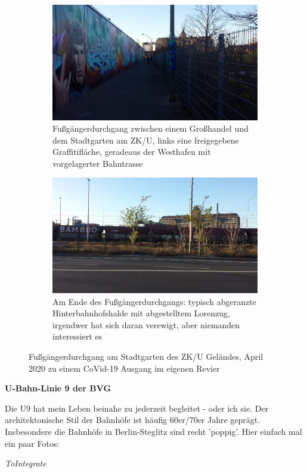 \begin{figure}[h]
\centering
	\begin{subfigure}[b]{0.49\textwidth}
    \includegraphics[width=1.0\textwidth]{img/inspiration/westhafen_view_preDurchgang.jpg}
   \caption{Fu{\ss}g\"angerdurchgang zwischen einem Gro{\ss}handel und dem Stadtgarten am ZK/U, links eine freigegebene Graffitifl\"ache, geradeaus der Westhafen mit vorgelagerter Bahntrasse}
    \label{img:inspiration_westhafen_view_preDurchgang}
    \end{subfigure}
	\begin{subfigure}[b]{0.49\textwidth}
    \includegraphics[width=1.0\textwidth]{img/inspiration/westhafen_view_postDurchgang.jpg}
   \caption{Am Ende des Fu{\ss}g\"angerdurchgangs: typisch abgeranzte Hinterbahnhofshalde mit abgestelltem Lorenzug, irgendwer hat sich daran verewigt, aber niemanden interessiert es\\}
    \label{img:inspiration_westhafen_view_postDurchgang}
    \end{subfigure}
	\caption{Fu{\ss}g\"angerdurchgang am Stadtgarten des ZK/U Gel\"andes, April 2020 zu einem CoVid-19 Ausgang im eigenen Revier}
	\label{img:inspiration_westhafen_view_durchgang}
\end{figure}



\textbf{U-Bahn-Linie 9 der BVG}

Die U9 hat mein Leben beinahe zu jederzeit begleitet - oder ich sie.
Der architektonische Stil der Bahnh\"ofe ist h\"aufig 60er/70er Jahre gepr\"agt.
Insbesondere die Bahnh\"ofe in Berlin-Steglitz sind recht 'poppig'.
Hier einfach mal ein paar Fotos:

\textit{ToIntegrate}

